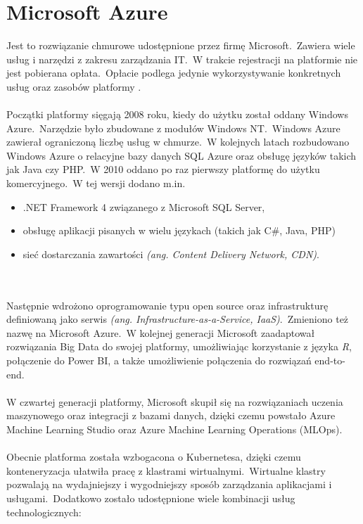 \chapter{Microsoft Azure}
Jest to rozwiązanie chmurowe udostępnione przez firmę Microsoft.\ Zawiera wiele usług i narzędzi z zakresu zarządzania IT.\ W trakcie rejestracji na platformie nie jest pobierana opłata.\ Opłacie podlega jedynie wykorzystywanie konkretnych usług oraz zasobów platformy .
\\ \\
Początki platformy sięgają 2008 roku, kiedy do użytku został oddany Windows Azure.\ Narzędzie było zbudowane z modułów Windows NT.\ Windows Azure zawierał ograniczoną liczbę usług w chmurze.\ W kolejnych latach rozbudowano Windows Azure o relacyjne bazy danych SQL Azure oraz obsługę języków takich jak Java czy PHP.\ W 2010 oddano po raz pierwszy platformę do użytku komercyjnego.\ W tej wersji dodano m.in.
\begin{itemize}
\item .NET Framework 4 związanego z Microsoft SQL Server,
\item obsługę aplikacji pisanych w wielu językach (takich jak C#, Java, PHP)
\item sieć dostarczania zawartości \textit{(ang. Content Delivery Network, CDN)}.
\end{itemize}

\\ \\
Następnie wdrożono oprogramowanie typu open source oraz infrastrukturę definiowaną jako serwis \textit{(ang. Infrastructure-as-a-Service, IaaS)}.\ Zmieniono też nazwę na Microsoft Azure.\ W kolejnej generacji Microsoft zaadaptował rozwiązania Big Data do swojej platformy, umożliwiając korzystanie z języka \textit{R}, połączenie do Power BI, a także umożliwienie połączenia do rozwiązań end-to-end.
\\ \\
W czwartej generacji platformy, Microsoft skupił się na rozwiązaniach uczenia maszynowego oraz integracji z bazami danych, dzięki czemu powstało Azure Machine Learning Studio oraz Azure Machine Learning Operations (MLOps).
\\ \\
Obecnie platforma została wzbogacona o Kubernetesa, dzięki czemu konteneryzacja ułatwiła pracę z klastrami wirtualnymi.\ Wirtualne klastry pozwalają na wydajniejszy i wygodniejszy sposób zarządzania aplikacjami i usługami.\ Dodatkowo zostało udostępnione wiele kombinacji usług technologicznych:

